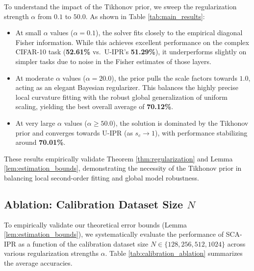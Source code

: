 \documentclass{article}
\theoremstyle{plain}
\theoremstyle{definition}
\theoremstyle{remark}
\begin{document}
To understand the impact of the Tikhonov prior, we sweep the regularization strength $\alpha$ from $0.1$ to $50.0$. As shown in Table \ref{tab:main_results}:
\begin{itemize}
    \item At small $\alpha$ values ($\alpha = 0.1$), the solver fits closely to the empirical diagonal Fisher information. While this achieves excellent performance on the complex CIFAR-10 task (\textbf{52.61\%} vs.\ U-IPR's \textbf{51.29\%}), it underperforms slightly on simpler tasks due to noise in the Fisher estimates of those layers.
    \item At moderate $\alpha$ values ($\alpha = 20.0$), the prior pulls the scale factors towards $1.0$, acting as an elegant Bayesian regularizer. This balances the highly precise local curvature fitting with the robust global generalization of uniform scaling, yielding the best overall average of \textbf{70.12\%}.
    \item At very large $\alpha$ values ($\alpha \ge 50.0$), the solution is dominated by the Tikhonov prior and converges towards U-IPR (as $s_c \to 1$), with performance stabilizing around \textbf{70.01\%}.
\end{itemize}
These results empirically validate Theorem \ref{thm:regularization} and Lemma \ref{lem:estimation_bounds}, demonstrating the necessity of the Tikhonov prior in balancing local second-order fitting and global model robustness.

\subsection{Ablation: Calibration Dataset Size \texorpdfstring{$N$}{N}}
\label{subsec:ablation_n}

To empirically validate our theoretical error bounds (Lemma \ref{lem:estimation_bounds}), we systematically evaluate the performance of SCA-IPR as a function of the calibration dataset size $N \in \{128, 256, 512, 1024\}$ across various regularization strengths $\alpha$. Table \ref{tab:calibration_ablation} summarizes the average accuracies.
\end{document}
